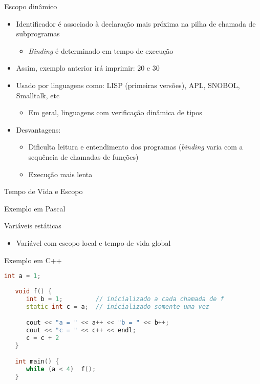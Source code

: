\documentclass[handout,aspectratio=169]{beamer}
\newcommand{\bi}{\begin{itemize}[<+->]}
\newcommand{\ei}{\end{itemize}}
\begin{document}
\begin{frame}{Escopo din\^{a}mico}

   \bi 
   \item Identificador \'{e} associado à declara\c{c}\~{a}o mais pr\'{o}xima na pilha de chamada de subprogramas
      \bi 
      \item  \emph{Binding} \'{e} determinado em tempo de execu\c{c}\~{a}o
      \ei
   \item Assim, exemplo anterior ir\'{a} imprimir: 20 e 30
   \item Usado por linguagens como: LISP (primeiras vers\~{o}es), APL, SNOBOL, Smalltalk, etc
      \bi 
      \item Em geral, linguagens com verifica\c{c}\~{a}o din\^{a}mica de tipos
      \ei
   \item Desvantagens:
      \bi 
      \item Dificulta leitura e entendimento dos programas (\emph{binding} varia com a sequ\^{e}ncia de chamadas de fun\c{c}\~{o}es)
      \item Execu\c{c}\~{a}o mais lenta
      \ei
   \ei
\end{frame}







\begin{frame}[fragile]{Tempo de Vida e Escopo}
	
		\begin{block}{Exemplo em Pascal}
		\centering
    \end{block}	

\end{frame}

\begin{frame}[fragile]{Vari\'{a}veis est\'{a}ticas}
	\bi
		\item Vari\'{a}vel com escopo local e tempo de vida global
	\ei
	
	\begin{block}{Exemplo em C++}
	\begin{lstlisting}[language=c++,numbers=none,basicstyle=\tiny]
   int a = 1;
  
   void f() {
      int b = 1;         // inicializado a cada chamada de f 
      static int c = a;  // inicializado somente uma vez

      cout << "a = " << a++ << "b = " << b++;
      cout << "c = " << c++ << endl;
      c = c + 2
   }

   int main() {
      while (a < 4)  f();
   }
   \end{lstlisting}
   \end{block}	
\end{frame}
\end{document}
